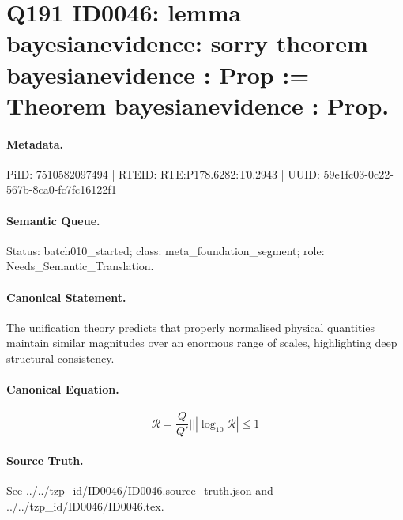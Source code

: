 \section*{Q191 ID0046: lemma bayesianevidence: sorry theorem bayesianevidence : Prop := Theorem bayesianevidence : Prop.}
\paragraph{Metadata.}
PiID: 7510582097494 | RTEID: RTE:P178.6282:T0.2943 | UUID: 59e1fc03-0c22-567b-8ca0-fc7fc16122f1

\paragraph{Semantic Queue.}
Status: batch010\_started; class: meta\_foundation\_segment; role: Needs\_Semantic\_Translation.

\paragraph{Canonical Statement.}
The unification theory predicts that properly normalised physical quantities maintain similar magnitudes over an enormous range of scales, highlighting deep structural consistency.

\paragraph{Canonical Equation.}
\[
\mathcal{R} = \frac{Q}{Q'} || \left|\log_{10}\mathcal{R}\right| \leq 1
\]

\paragraph{Source Truth.}
See ../../tzp\_id/ID0046/ID0046.source\_truth.json and ../../tzp\_id/ID0046/ID0046.tex.
